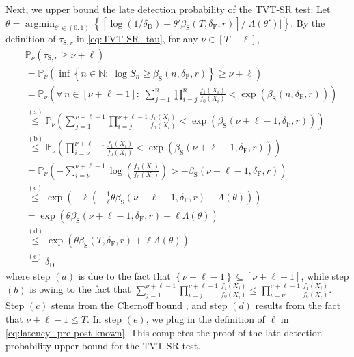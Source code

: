 \documentclass[12pt]{interact}
\newcommand{\aaaa}{\mathrm{(a)}}
\newcommand{\bbbb}{\mathrm{(b)}}
\newcommand{\cccc}{\mathrm{(c)}}
\newcommand{\dddd}{\mathrm{(d)}}
\newcommand{\eeee}{\mathrm{(e)}}
\newcommand{\lp}{\left(}
\newcommand{\rp}{\right)}
\newcommand{\lb}{\left[}
\newcommand{\rb}{\right]}
\newcommand{\lbp}{\left\{}
\newcommand{\rbp}{\right\}}
\newcommand{\mrm}{\mathrm}
\newcommand{\mbb}{\mathbb}
\renewcommand{\Pr}{\mathbb{P}}
\newcommand{\argmin}{\mathop{\mathrm{argmin}}}
\theoremstyle{plain}
\begin{document}
Next, we upper bound the late detection probability of the TVT-SR test: Let $\theta = \argmin_{\theta' \in \lp 0,1 \rp} \lbp\lb\log\lp1/\delta_{\mathrm{D}}\rp+\theta'\beta_{\mrm{S}}\lp T, \delta_{\mrm{F}}, r\rp\rb/\lvert\Lambda\lp\theta'\rp\rvert\rbp$. By the definition of $\tau_{\mrm{S}, r}$ in \eqref{eq:TVT-SR_tau}, for any $\nu \in \lb T-\ell\rb$,
%
\begin{align}
    &\Pr_{\nu}\lp\tau_{\mrm{S}, r} \geq \nu+\ell\rp \nonumber\\
    &=\Pr_{\nu}\lp\inf\lbp n\in\mbb{N}:\; \log S_{n}\geq\beta_{\mrm{S}}\lp n,\delta_{\mathrm{F}},r\rp\rbp\geq\nu+\ell\rp \nonumber\\
    &=\Pr_{\nu}\lp\forall\,n\in\lb\nu+\ell-1\rb:\;\sum_{j=1}^{n} \prod_{i=j}^{n}\frac{f_{1}\lp X_{i}\rp}{f_{0}\lp X_{i}\rp}<\exp\lp\beta_{\mrm{S}}\lp n,\delta_{\mathrm{F}},r\rp\rp\rp\nonumber\\
    &\overset{\aaaa}{\leq} \Pr_{\nu}\lp\sum_{j=1}^{\nu+\ell-1} \prod_{i=j}^{\nu+\ell-1}\frac{f_{1}\lp X_{i}\rp}{f_{0}\lp X_{i}\rp}<\exp\lp\beta_{\mrm{S}}\lp \nu+\ell-1,\delta_{\mathrm{F}},r\rp\rp\rp \nonumber\\
    &\overset{\bbbb}{\leq} \Pr_{\nu}\lp \prod_{i=\nu}^{\nu+\ell-1}\frac{f_{1}\lp X_{i}\rp}{f_{0}\lp X_{i}\rp}<\exp\lp\beta_{\mrm{S}}\lp \nu+\ell-1,\delta_{\mathrm{F}},r\rp\rp\rp \nonumber\\
    &=\Pr_{\nu}\lp-\sum_{i=\nu}^{\nu+\ell-1}\log\lp\frac{f_{1}\lp X_{i}\rp}{f_{0}\lp X_{i}\rp}\rp>-\beta_{\mrm{S}}\lp \nu+\ell-1,\delta_{\mathrm{F}},r\rp\rp \nonumber\\
    &\overset{\cccc}{\leq}\exp\lp-\ell\lp-\frac{1}{\ell}\theta\beta_{\mrm{S}}\lp \nu+\ell-1,\delta_{\mathrm{F}},r\rp-\Lambda\lp\theta\rp\rp\rp \nonumber\\
    &=\exp\lp \theta\beta_{\mrm{S}}\lp \nu+\ell-1,\delta_{\mathrm{F}},r\rp + \ell\Lambda\lp\theta\rp\rp \nonumber\\
    &\overset{\dddd}{\leq}\exp\lp \theta\beta_{\mrm{S}}\lp T,\delta_{\mathrm{F}},r\rp + \ell\Lambda\lp\theta\rp\rp \nonumber\\
    &\overset{\eeee}{=}\delta_{\mrm{D}} \label{eq:TVT-SR_LD_1}
\end{align}
%
where step $(a)$ is due to the fact that $\lbp \nu+\ell-1\rbp\subseteq\lb\nu+\ell-1\rb$, while step $(b)$ is owing to the fact that $\sum_{j=1}^{\nu+\ell-1} \prod_{i=j}^{\nu+\ell-1}\frac{f_{1}\lp X_{i}\rp}{f_{0}\lp X_{i}\rp} \leq \prod_{i=\nu}^{\nu+\ell-1}\frac{f_{1}\lp X_{i}\rp}{f_{0}\lp X_{i}\rp}$. Step $(c)$ stems from the Chernoff bound \citep{chernoff1952measure}, and step $(d)$ results from the fact that $\nu+\ell-1\leq T$. In step $(e)$, we plug in the definition of $\ell$ in \eqref{eq:latency_pre-post-known}. This completes the proof of the late detection probability upper bound for the TVT-SR test.
\end{document}
